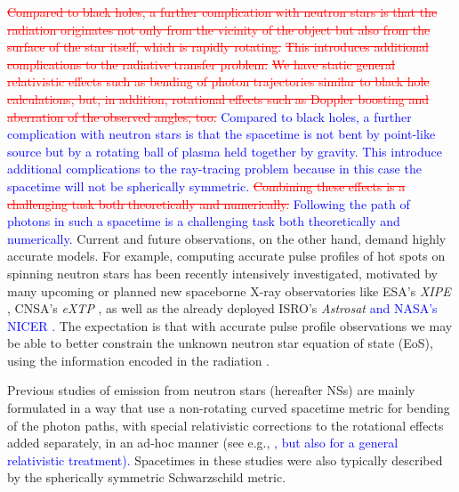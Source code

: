 \documentclass{aa}
\newcommand{\refe}[1]{\textcolor{blue}{{#1}}}
\newcommand{\refedel}[1]{\textcolor{red}{\sout{#1}}}
\newcommand{\sch}{Schwarzschild }
\begin{document}
\refedel{Compared to black holes, a further complication with neutron stars is that the radiation originates not only from the vicinity of the object but also from the surface of the star itself, which is rapidly rotating.}
\refedel{This introduces additional complications to the radiative transfer problem: }
\refedel{We have static general relativistic effects such as bending of photon trajectories similar to black hole calculations, but, in addition, rotational effects such as Doppler boosting and aberration of the observed angles, too.}
\refe{
Compared to black holes, a further complication with neutron stars is that the spacetime is not bent by point-like source but by a rotating ball of plasma held together by gravity.
This introduce additional complications to the ray-tracing problem because in this case the spacetime will not be spherically symmetric.
}
\refedel{Combining these effects is a challenging task both theoretically and numerically.}
\refe{Following the path of photons in such a spacetime is a challenging task both theoretically and numerically.}
Current and future observations, on the other hand, demand highly accurate models.
For example, computing accurate pulse profiles of hot spots on spinning neutron stars has been recently intensively investigated, motivated by many upcoming or planned new spaceborne X-ray observatories like ESA's \textit{XIPE} \citep{XIPE}, CNSA's \textit{eXTP} \citep{eXTP}, as well as the already deployed ISRO's \textit{Astrosat} \citep{Astrosat} \refe{and NASA's NICER \citep{NICER}.}
The expectation is that with accurate pulse profile observations we may be able to better constrain the unknown neutron star equation of state (EoS), using the information encoded in the radiation \citep[see e.g.,][]{LMB13}.

Previous studies of emission from neutron stars (hereafter NSs) are mainly formulated in a way that use a non-rotating curved spacetime metric for bending of the photon paths, with special relativistic corrections to the rotational effects added separately, in an ad-hoc manner (see e.g.,\refe{ \citealt{PFC83,P95, ML98, WM01, PG03, PB06, Lamb09a, Lamb09b, LMB13, ML15}, but also \citealt{BR01} for a general relativistic treatment). } 
Spacetimes in these studies were also typically described by the spherically symmetric \sch metric.
\end{document}
